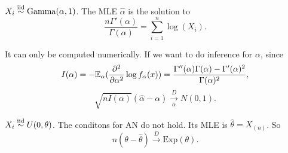 \begin{exap}
	$X_i \stackrel{\text{iid}}{\sim} \mathrm{Gamma}(\alpha, 1)$. The MLE $\hat{\alpha}$ is the solution to
	$$\frac{n \Gamma'(\alpha)}{\Gamma(\alpha)} = \sum_{i=1}^n \log(X_i).$$
	
	It can only be computed numerically. If we want to do inference for $\alpha$, since 
	$$I(\alpha) = - \mathbb{E}_\alpha ( \frac{\partial^2}{\partial \alpha^2} \log f_\alpha(x)) = \frac{ \Gamma''(\alpha)\Gamma(\alpha) - \Gamma'(\alpha)^2 }{\Gamma(\alpha)^2},$$
	$$\sqrt{nI(\alpha)}(\hat{\alpha} - \alpha) \xrightarrow[\alpha]{D} N(0,1).$$
\end{exap}

\begin{exap}
	$X_i \stackrel{\text{iid}}{\sim} U(0, \theta)$. The conditons for AN do not hold. Its MLE is $\hat{\theta} = X_{(n)}$. So
	$$n(\theta - \hat{\theta}) \xrightarrow{D} \mathrm{Exp}(\theta).$$
\end{exap}